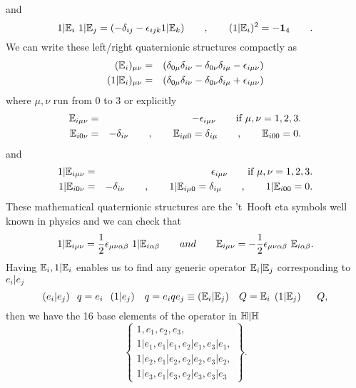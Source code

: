 \documentclass[a4paper,12pt]{book}
\begin{document}
and 
\begin{equation}
1|\Bbb{E}_{i}~1|\Bbb{E}_{j}=(-\delta _{ij}-\epsilon _{ijk}1|\Bbb{E}%
_{k})\qquad ,\qquad (1|\Bbb{E}_{i})^{2}=-\mathbf{1}_{4}\qquad .  \label{q4}
\end{equation}
We can write these left/right quaternionic structures compactly as 
\begin{eqnarray}
(\Bbb{E}_{i})_{\mu \nu } &=&(\delta _{0\mu }\delta _{i\nu }-\delta _{0\nu
}\delta _{i\mu }-\epsilon _{i\mu \nu })  \label{cqs1} \\
({1|}\Bbb{E}_{i})_{\mu \nu } &=&(\delta _{0\mu }\delta _{i\nu }-\delta
_{0\nu }\delta _{i\mu }+\epsilon _{i\mu \nu })
\end{eqnarray}
where $\mu ,\nu $ run from 0 to 3 or explicitly 
\begin{eqnarray}
\Bbb{E}_{i\mu \nu } &=&-\epsilon _{i\mu \nu }\mbox{\qquad if }\mu ,\nu
=1,2,3.  \label{cqs2} \\
\Bbb{E}_{i0\nu } &=&-\delta _{i\nu }\qquad ,\qquad \Bbb{E}_{i\mu 0}=\delta
_{i\mu }\qquad ,\qquad \Bbb{E}_{i00}=0.
\end{eqnarray}
and 
\begin{eqnarray}
1|\Bbb{E}_{i\mu \nu } &=&\epsilon _{i\mu \nu }\mbox{\qquad if }\mu ,\nu
=1,2,3.  \label{cqs3} \\
1|\Bbb{E}_{i0\nu } &=&-\delta _{i\nu }\qquad ,\qquad 1|\Bbb{E}_{i\mu
0}=\delta _{i\mu }\qquad ,\qquad 1|\Bbb{E}_{i00}=0.
\end{eqnarray}
These mathematical quaternionic structures are the 't~Hooft eta symbols \cite
{hooft1} well known in physics and we can check that 
\begin{equation}
1|\Bbb{E}_{i\mu \nu }=\frac{1}{2}\epsilon _{\mu \nu \alpha \beta }~1|\Bbb{E}%
_{i\alpha \beta }\qquad and\qquad \Bbb{E}_{i\mu \nu }=-\frac{1}{2}\epsilon
_{\mu \nu \alpha \beta }~\Bbb{E}_{i\alpha \beta }.
\end{equation}
Having $\Bbb{E}_{i},1|\Bbb{E}_{i}$ enables us to find any generic operator $%
\Bbb{E}_{i}|\Bbb{E}_{j}$ corresponding to $e_{i}|e_{j}$ 
\begin{equation}
\left( e_{i}|e_{j}\right) \;\;q=e_{i}\;\;\left( 1|e_{j}\right)
\;\;\;q=e_{i}qe_{j}\equiv \left( \Bbb{E}_{i}|\Bbb{E}_{j}\right) \;\;\;Q=\Bbb{%
E}_{i}\;\left( 1|\Bbb{E}_{j}\right) \;\;\;\;\ Q,
\end{equation}
then we have the 16 base elements of the operator in $\Bbb{H}|\Bbb{H}$ 
\begin{equation}
\left\{ 
\begin{array}{c}
1,e_{1},e_{2},e_{3}, \\ 
1|e_{1},e_{1}|e_{1},e_{2}|e_{1},e_{3}|e_{1}, \\ 
1|e_{2},e_{1}|e_{2},e_{2}|e_{2},e_{3}|e_{2}, \\ 
1|e_{3},e_{1}|e_{3},e_{2}|e_{3},e_{3}|e_{3}
\end{array}
\right\} .
\end{equation}
\end{document}
